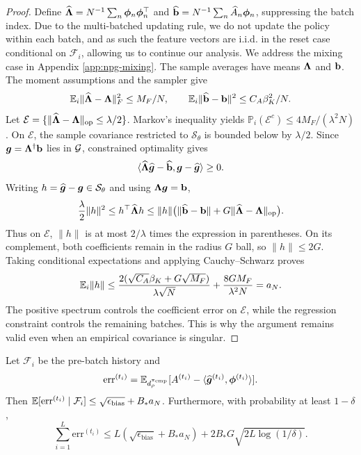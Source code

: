 \begin{proof}
    Define $\widehat{\boldsymbol{\Lambda}}=N^{-1}\sum_n\boldsymbol{\phi}_n\boldsymbol{\phi}_n^\top$ and
$\widehat{\mathbf{b}}=N^{-1}\sum_n\widehat A_n\boldsymbol{\phi}_n$, suppressing the batch index.
Due to the multi-batched updating rule, we do not update the policy within each batch, and as such the feature vectors are i.i.d. in the reset case conditional on $\mathcal F_i$, allowing us to continue our analysis. We address the mixing case in Appendix \ref{app:npg-mixing}. The sample averages have means $\boldsymbol{\Lambda}$ and $\mathbf{b}$. The moment assumptions and the sampler give
\[
\mathbb{E}_i\|\widehat{\boldsymbol{\Lambda}}-\boldsymbol{\Lambda}\|_F^2\leq M_F/N,
\qquad
\mathbb{E}_i\|\widehat{\mathbf{b}}-\mathbf{b}\|^2\leq C_A\beta_K^2/N.
\]
Let $\mathcal E=\{\|\widehat{\boldsymbol{\Lambda}}-\boldsymbol{\Lambda}\|_{\mathrm{op}}\leq\lambda/2\}$.
Markov's inequality yields $\mathbb{P}_i(\mathcal E^c)\leq4M_F/(\lambda^2N)$.
On $\mathcal E$, the sample covariance restricted to $\mathcal S_\theta$ is bounded
below by $\lambda/2$. Since $\bm{g}=\boldsymbol{\Lambda}^\dagger\mathbf{b}$ lies in
${\mathcal{G}}$, constrained optimality gives
\[
\langle\widehat{\boldsymbol{\Lambda}}\widehat{\bm{g}}-\widehat{\mathbf{b}},
\bm{g}-\widehat{\bm{g}}\rangle\geq0.
\]
Writing $h=\widehat{\bm{g}}-\bm{g}\in\mathcal S_\theta$ and using $\boldsymbol{\Lambda}\bm{g}=\mathbf{b}$,
\[
\frac\lambda2\|h\|^2
\leq h^\top\widehat{\boldsymbol{\Lambda}} h
\leq\|h\|\bigl(\|\widehat{\mathbf{b}}-\mathbf{b}\|
+G\|\widehat{\boldsymbol{\Lambda}}-\boldsymbol{\Lambda}\|_{\mathrm{op}}\bigr).
\]
Thus on $\mathcal E$, $\|h\|$ is at most $2/\lambda$ times the expression
in parentheses. On its complement, both coefficients remain in the radius
$G$ ball, so $\|h\|\leq2G$. Taking conditional expectations and applying
Cauchy--Schwarz proves
\[
\mathbb{E}_i\|h\|\leq
\frac{2(\sqrt{C_A}\beta_K+G\sqrt{M_F})}{\lambda\sqrt N}
+\frac{8GM_F}{\lambda^2N}=a_N.
\]
The positive spectrum controls the coefficient error on $\mathcal E$, while
the regression constraint controls the remaining batches. This is why the
argument remains valid even when an empirical covariance is singular.
\end{proof}


\begin{lem}
Let $\mathcal F_i$ be the pre-batch history and
\[
\mathrm{err}^{(t_i)}=
\mathbb{E}_{d_\rho^{\pi_{\rm cmp}}}
[A^{(t_i)}-\langle\widehat{\bm{g}}^{(t_i)},\boldsymbol{\phi}^{(t_i)}\rangle].
\]
Then
$\mathbb{E}[\mathrm{err}^{(t_i)}\mid\mathcal F_i]
\leq\sqrt{\epsilon_{\mathrm{bias}}}+B_*a_N$.
Furthermore, with probability at least $1-\delta$,
\[
\sum_{i=1}^L\mathrm{err}^{(t_i)}
\leq L(\sqrt{\epsilon_{\mathrm{bias}}}+B_*a_N)
+2B_*G\sqrt{2L\log(1/\delta)}.
\]
\label{lem:npg-err-t-bound}
\end{lem}


